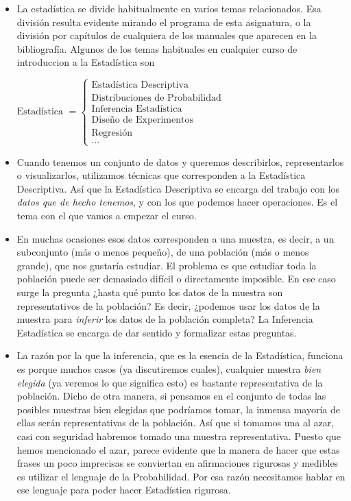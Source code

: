 \begin{itemize}
    \item La estadística se divide habitualmente en varios temas relacionados. Esa división resulta evidente mirando el programa de esta asignatura, o la división por capítulos de cualquiera de los manuales que aparecen en la bibliografía. Algunos de los temas habituales en cualquier curso de introduccion a la Estadística son
        \begin{center}
        $
        \mbox{Estadística }=\begin{cases}
        \mbox{Estadística Descriptiva}\\
        \mbox{Distribuciones de Probabilidad}\\
        \mbox{Inferencia Estadística}\\
        \mbox{Diseño de Experimentos}\\
        \mbox{Regresión}\\
        \mbox{...}
        \end{cases}
        $
        \end{center}

    \item Cuando tenemos un conjunto de datos y queremos describirlos, representarlos o  visualizarlos, utilizamos técnicas que corresponden a la {\sf Estadística Descriptiva}. Así que la Estadística Descriptiva se encarga del trabajo con los {\em datos que de hecho tenemos}, y con los que podemos hacer operaciones. Es el tema con el que vamos a empezar el curso.

    \item En muchas ocasiones esos datos corresponden a una {\sf muestra}, es decir, a un subconjunto (más o menos pequeño), de una {\sf población} (más o menos grande), que nos gustaría estudiar. El problema es que estudiar toda la población puede ser demasiado difícil o directamente imposible. En ese caso surge la pregunta ¿hasta qué punto los datos de la muestra son representativos de la población? Es decir, ¿podemos usar los datos de la muestra para {\em inferir} los datos de la población completa? La {\sf Inferencia Estadística} se encarga de dar sentido y formalizar estas preguntas.

    \item La razón por la que la inferencia, que es la esencia de la Estadística, funciona es porque muchos casos (ya discutiremos cuales), cualquier muestra {\em bien elegida} (ya veremos lo que significa esto) es bastante representativa de la población. Dicho de otra manera, si pensamos en el conjunto de todas las posibles muestras bien elegidas que podríamos tomar, la inmensa mayoría de ellas serán representativas de la población. Así que si tomamos una al azar, casi con seguridad habremos tomado una muestra representativa. Puesto que hemos mencionado el azar, parece evidente que la manera de hacer que estas frases un poco imprecisas se conviertan en afirmaciones rigurosas y medibles es utilizar el lenguaje de la {\sf Probabilidad}. Por esa razón necesitamos hablar en ese lenguaje para poder hacer Estadística rigurosa.


\end{itemize}
